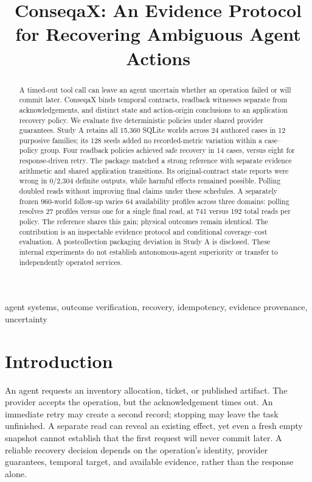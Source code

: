 \documentclass[conference]{IEEEtran}
\title{ConseqaX: An Evidence Protocol for Recovering Ambiguous Agent Actions}
\author{\IEEEauthorblockN{Devrajsinh Jhala}\IEEEauthorblockA{Independent Researcher}}
\begin{document}
\raggedbottom
\maketitle

\begin{abstract}
A timed-out tool call can leave an agent uncertain whether an operation failed or will commit later. ConseqaX binds temporal contracts, readback witnesses separate from acknowledgements, and distinct state and action-origin conclusions to an application recovery policy. We evaluate five deterministic policies under shared provider guarantees. Study A retains all 15,360 SQLite worlds across 24 authored cases in 12 purposive families; its 128 seeds added no recorded-metric variation within a case--policy group. Four readback policies achieved safe recovery in 14 cases, versus eight for response-driven retry. The package matched a strong reference with separate evidence arithmetic and shared application transitions. Its original-contract state reports were wrong in 0/2,304 definite outputs, while harmful effects remained possible. Polling doubled reads without improving final claims under these schedules. A separately frozen 960-world follow-up varies 64 availability profiles across three domains: polling resolves 27 profiles versus one for a single final read, at 741 versus 192 total reads per policy. The reference shares this gain; physical outcomes remain identical. The contribution is an inspectable evidence protocol and conditional coverage--cost evaluation. A postcollection packaging deviation in Study A is disclosed. These internal experiments do not establish autonomous-agent superiority or transfer to independently operated services.
\end{abstract}
\begin{IEEEkeywords}agent systems, outcome verification, recovery, idempotency, evidence provenance, uncertainty\end{IEEEkeywords}

\section{Introduction}

An agent requests an inventory allocation, ticket, or published artifact. The provider accepts the operation, but the acknowledgement times out. An immediate retry may create a second record; stopping may leave the task unfinished. A separate read can reveal an existing effect, yet even a fresh empty snapshot cannot establish that the first request will never commit later. A reliable recovery decision depends on the operation's identity, provider guarantees, temporal target, and available evidence, rather than the response alone.
\end{document}
